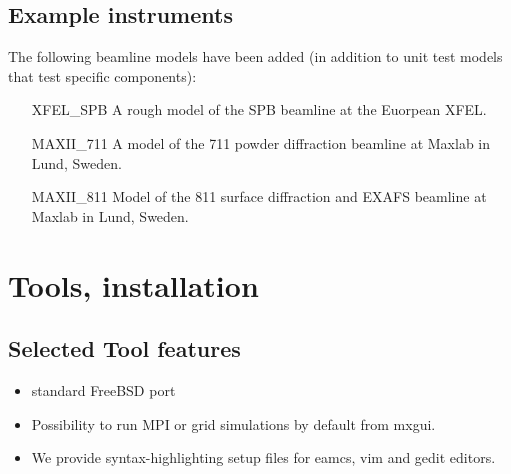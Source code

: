 \subsection{Example instruments}
The following beamline models have been added (in addition to unit test models that test specific components):
\begin{itemize}
  \item[XFEL\_SPB] A rough model of the SPB beamline at the Euorpean XFEL.
  \item[MAXII\_711] A model of the 711 powder diffraction beamline at Maxlab in Lund, Sweden.
  \item[MAXII\_811] Model of the 811 surface diffraction and EXAFS beamline at Maxlab in Lund, Sweden.
\end{itemize}


\section{Tools, installation}
\label{s:new-features:tools}
\subsection{Selected Tool features}
\begin{itemize}
  \item standard FreeBSD port
  \item Possibility to run MPI or grid simulations by default from mxgui.
  \item We provide syntax-highlighting setup files for eamcs, vim and gedit editors.
\end{itemize}
